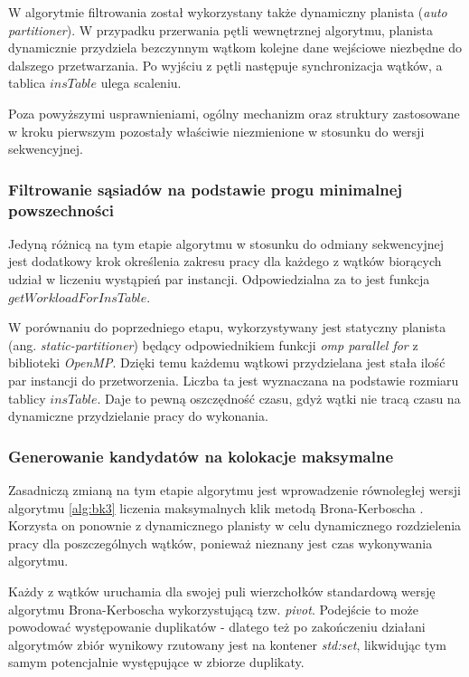 \documentclass[12pt]{article}
\begin{document}
W algorytmie filtrowania został wykorzystany także dynamiczny planista (\textit{auto partitioner}). W przypadku przerwania pętli wewnętrznej algorytmu, planista dynamicznie przydziela bezczynnym wątkom kolejne dane wejściowe niezbędne do dalszego przetwarzania. Po wyjściu z pętli następuje synchronizacja wątków, a tablica $ insTable $ ulega scaleniu.

Poza powyższymi usprawnieniami, ogólny mechanizm oraz struktury zastosowane w kroku pierwszym pozostały właściwie niezmienione w stosunku do wersji sekwencyjnej. 

\subsubsection{Filtrowanie sąsiadów na podstawie progu minimalnej powszechności}

Jedyną różnicą na tym etapie algorytmu w stosunku do odmiany sekwencyjnej jest dodatkowy krok określenia zakresu pracy dla każdego z wątków biorących udział w liczeniu wystąpień par instancji. Odpowiedzialna za to jest funkcja $ getWorkloadForInsTable $.

W porównaniu do poprzedniego etapu, wykorzystywany jest statyczny planista (ang. \textit{static-partitioner}) będący odpowiednikiem funkcji \textit{omp parallel for} z biblioteki \textit{OpenMP}. Dzięki temu każdemu wątkowi przydzielana jest stała ilość par instancji do przetworzenia. Liczba ta jest wyznaczana na podstawie rozmiaru tablicy $ insTable $. Daje to pewną oszczędność czasu, gdyż wątki nie tracą czasu na dynamiczne przydzielanie pracy do wykonania.

\subsubsection{Generowanie kandydatów na kolokacje maksymalne}

Zasadniczą zmianą na tym etapie algorytmu jest wprowadzenie równoległej wersji algorytmu \ref{alg:bk3} liczenia maksymalnych klik metodą Brona-Kerboscha \cite{kerbosz}. Korzysta on ponownie z dynamicznego planisty w celu dynamicznego rozdzielenia pracy dla poszczególnych wątków, ponieważ nieznany jest czas wykonywania algorytmu.

Każdy z wątków uruchamia dla swojej puli wierzchołków standardową wersję algorytmu Brona-Kerboscha wykorzystującą tzw. \textit{pivot}. Podejście to może powodować występowanie duplikatów - dlatego też po zakończeniu działani algorytmów zbiór wynikowy rzutowany jest na kontener \textit{std:set}, likwidując tym samym potencjalnie występujące w zbiorze duplikaty. 
\end{document}
